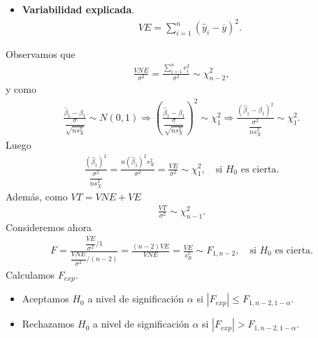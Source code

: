 \begin{enumerate}
\begin{defi}
\begin{itemize}
                  \item \textbf{Variabilidad  explicada}.
                        \begin{align*}
                            VE = \sum_{i=1}^{n} (\widehat{y}_i - \overline{y})^2.
                        \end{align*}
              \end{itemize}
          \end{defi}
          Observamos que
          \begin{align*}
              \frac{VNE}{\sigma^2} = \frac{\sum_{i=1}^n e_i^2}{\sigma^2} \sim \chi^2_{n-2},
          \end{align*}
          y como
          \begin{align*}
              \frac{\widehat{\beta}_1 - \beta_1}{\dfrac{\sigma}{\sqrt{ns_X^2}}} \sim N(0,1) \Longrightarrow \left(\frac{\widehat{\beta}_1 - \beta_1}{\dfrac{\sigma}{\sqrt{ns_X^2}}} \right)^2 \sim \chi_1^2 \Longrightarrow \frac{(\widehat{\beta}_1 - \beta_1)^2}{\dfrac{\sigma^2}{ns_X^2}} \sim \chi^2_1.
          \end{align*}
          Luego
          \begin{align*}
              \frac{(\widehat{\beta}_1)^2}{\dfrac{\sigma^2}{ns_X^2}} = \frac{n(\widehat{\beta}_1)^2s_X^2}{\sigma^2} = \frac{VE}{\sigma^2} \sim \chi^2_1, \quad \text{si $H_0$ es cierta}.
          \end{align*}
          Además, como $VT = VNE + VE$
          \begin{align*}
              \frac{VT}{\sigma^2} \sim \chi_{n-1}^2.
          \end{align*}
          Consideremos ahora
          \begin{align*}
              F = \frac{\dfrac{VE}{\sigma^2}/1}{\dfrac{VNE}{\sigma^2}/(n-2)} = \frac{(n-2)VE}{VNE} = \frac{VE}{s_R^2} \sim F_{1,n-2}, \quad \text{si $H_0$ es cierta}.
          \end{align*}
          Calculamos $F_{exp}$.
          \begin{itemize}
              \item Aceptamos $H_0$ a nivel de significación $\alpha$ si $|F_{exp}| \leq F_{1,n-2,1-\alpha}$.
              \item Rechazamos $H_0$ a nivel de significación $\alpha$ si $|F_{exp}| > F_{1,n-2,1-\alpha}$.
          \end{itemize}
\end{enumerate}
